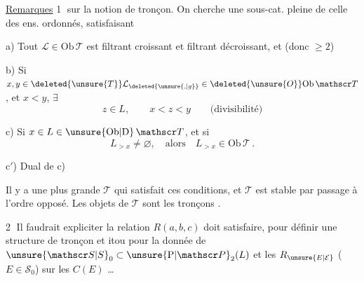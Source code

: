 \uline{Remarques} \textcircled{1}  sur la notion de tronçon. On cherche une sous-cat. pleine  de celle des ens. ordonnés, satisfaisant

a) Tout $\mathcal L\in\mathrm{Ob}\,\mathscr T$ est filtrant croissant et filtrant décroissant, et   (donc $\geq2$)

b) Si $x,y\in\deleted{\unsure{T}}\mathcal L_{\deleted{\unsure{,|g}}}\in\deleted{\unsure{O}}\mathrm{Ob}\,\mathscr T$, et $x<y$, $\exists$
\[
 z\in L,\qquad x<z<y\qquad\text{(divisibilité)}
\]

c) Si $x\in L\in\unsure{\mathrm{Ob}|\mathrm D}\,\mathscr T$,  et si
\[
 L_{>x}\ne\varnothing,\quad\text{alors}\quad L_{>x}\in\mathrm{Ob}\,\mathscr T\,.
\]

c$'$) Dual de c)

Il y a une plus grande $\mathscr T$ qui satisfait ces conditions, et $\mathscr T$ est stable par passage à l'ordre opposé. Les objets de $\mathscr T$ sont les tronçons .

\textcircled{2} Il faudrait expliciter   la relation $R(a,b,c)$ doit satisfaire, pour définir une structure de tronçon \unsure{,} et itou pour la donnée de $\unsure{\mathscr S|S}_0\subset\unsure{\mathrm P|\mathscr P}_2(L)$ et les $R_{\unsure{E|\mathcal E}}$\unsure{,} ($E\in\mathscr S_0$) sur les $C(E)$ \ldots
